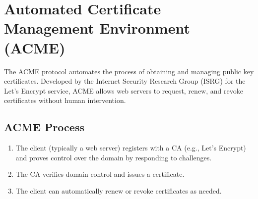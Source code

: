 \section{Automated Certificate Management Environment (ACME)}
The ACME protocol automates the process of obtaining and managing public key certificates. Developed by the Internet Security Research Group (ISRG) for the Let's Encrypt service, ACME allows web servers to request, renew, and revoke certificates without human intervention.

\subsection{ACME Process}
\begin{enumerate}
    \item The client (typically a web server) registers with a CA (e.g., Let's Encrypt) and proves control over the domain by responding to challenges.
    \item The CA verifies domain control and issues a certificate.
    \item The client can automatically renew or revoke certificates as needed.
\end{enumerate}

